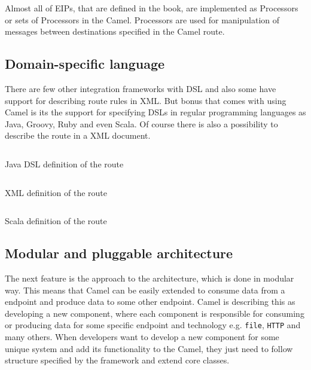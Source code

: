 \documentclass[12pt,final,oneside]{fithesis2}
\begin{document}
Almost all of EIPs, that are defined in the book, are implemented as Processors or sets of Processors in the Camel. Processors are used for manipulation of messages between destinations specified in the Camel route.\cite{camel-dzone}



\subsection*{Domain-specific language}
There are few other integration frameworks with DSL and also some have support for describing route rules in XML. But bonus that comes with using Camel is its the support for specifying DSLs in regular programming languages as Java, Groovy, Ruby and even Scala. Of course there is also a possibility to describe the route in a XML document. 

\begin{listing}[ht]
	\inputminted[]{java}{sources/java_dsl_example.java}
	\caption{Java DSL definition of the route}

\end{listing}

\begin{listing}[ht]
	\inputminted[]{xml}{sources/xml_example.xml}
	\caption{XML definition of the route }

\end{listing}

\begin{listing}[ht, p!]
	\inputminted[]{java}{sources/scala_example.java}
	\caption{Scala definition of the route }

\end{listing}


\subsection*{Modular and pluggable architecture}
The next feature is the approach to the architecture, which is done in modular way. This means that Camel can be easily extended to consume data from a endpoint and produce data to some other endpoint. Camel is describing this as developing a new component, where each component is responsible for consuming or producing data for some specific endpoint and technology e.g. \texttt{file}, \texttt{HTTP} and many others. When developers want to develop a new component for some unique system and add its functionality to the Camel, they just need to follow structure specified by the framework and extend core classes. 
\end{document}
